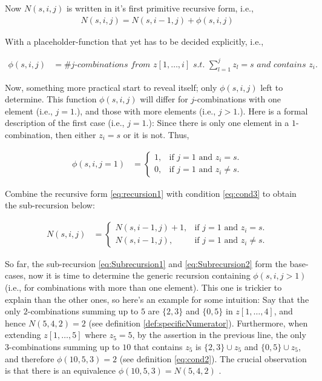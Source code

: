 \documentclass[a4paper]{article}
\begin{document}
Now $N(s,i,j)$ is written in it's first primitive recursive form, i.e.,
\begin{align}
\label{eq:recursion1}
N(s,i,j) = N(s,i-1,j)+ \phi (s,i,j) 
\end{align}

With a placeholder-function that yet has to be decided explicitly, i.e.,

\begin{align}
\label{eq:cond2}
\phi (s,i,j) &= \textit{\# $j$-combinations from $z[1,\ldots,i]$ s.t. $\sum _{l=1}^{j}z_{l}=s$ and contains $z_{i}$.}
\end{align}

Now, something more practical start to reveal itself; only $\phi (s,i,j)$ left to determine. This function $\phi (s,i,j)$ will differ for $j$-combinations with one element (i.e., $j=1$.), and those with more elements (i.e., $j>1$.). Here is a formal description of the first case (i.e., $j=1$.): Since there is only one element in a $1$-combination, then either $z_{i}=s$ or it is not. Thus,

\begin{align}
\label{eq:cond3}
\phi (s,i,j=1) &=\begin{cases}
    1, & \text{if $j=1$ and $z_{i}=s$}.\\
    0, & \text{if $j=1$ and $z_{i}\neq s$}.
  \end{cases}
\end{align}

Combine the recursive form \ref{eq:recursion1} with condition \ref{eq:cond3} to obtain the sub-recursion below:

\begin{align}
\label{eq:Subrecursion2}
N(s,i,j) &=\begin{cases}
    N(s,i-1,j)+1, & \text{if $j=1$ and $z_{i}=s$}.\\
    N(s,i-1,j), & \text{if $j=1$ and $z_{i}\neq s$}.
  \end{cases}
\end{align}

So far, the sub-recursion \ref{eq:Subrecursion1} and \ref{eq:Subrecursion2} form the base-cases, now it is time to determine the generic recursion containing $\phi (s,i,j>1)$ (i.e., for combinations with more than one element). This one is trickier to explain than the other ones, so here's an example for some intuition: Say that the only $2$-combinations summing up to $5$ are $\{2,3\}$ and $\{0,5\}$ in $z[1,\ldots,4]$, and hence $N(5,4,2)=2$ (see definition \ref{def:specificNumerator}). Furthermore, when extending $z[1,\ldots,5]$ where $z_{5}=5$, by the assertion in the previous line, the only $3$-combinations summing up to $10$ that contains $z_{5}$ is $\{2,3\} \cup {z_{5}}$ and $\{0,5\} \cup {z_{5}}$, and therefore $\phi (10,5,3)=2$ (see definition \ref{eq:cond2}). The crucial observation is that there is an equivalence $\phi (10,5,3)=N(5,4,2)$ .
\end{document}
